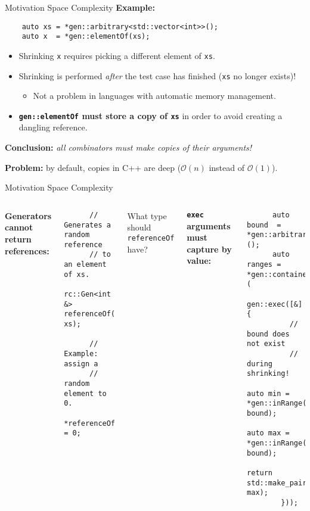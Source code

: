 \begin{frame}[fragile]{\halcheck{} \textemdash{} Motivation \textemdash{} Space Complexity}
  \textbf{Example:}
  \begin{verbatim}
    auto xs = *gen::arbitrary<std::vector<int>>();
    auto x  = *gen::elementOf(xs);
  \end{verbatim}

  \pause{}

  \begin{itemize}
    \item Shrinking \texttt{x} requires picking a different element of \texttt{xs}.
          \pause{}

    \item Shrinking is performed \emph{after} the test case has finished (\texttt{xs} no longer exists)!
          \begin{itemize}
            \item Not a problem in languages with automatic memory management.
          \end{itemize}
          \pause{}

    \item \textbf{\texttt{gen::elementOf} must store a copy of \texttt{xs}} in order to avoid creating a dangling reference.
          \pause{}
  \end{itemize}

  \textbf{Conclusion:} \textit{all combinators must make copies of their arguments!}

  \textbf{Problem:} by default, copies in C++ are deep ($\mathcal{O}(n)$ instead of $\mathcal{O}(1)$).
\end{frame}

\begin{frame}[fragile]{\halcheck{} \textemdash{} Motivation \textemdash{} Space Complexity}
  \begin{columns}[t]
    \textbf{Generators cannot return references:}

    \begin{verbatim}
      // Generates a random reference
      // to an element of xs.
      rc::Gen<int &> referenceOf(??? xs);

      // Example: assign a
      // random element to 0.
      *referenceOf(xs) = 0;
    \end{verbatim}

    What type should \texttt{referenceOf} have?

    \pause{}

    \textbf{\texttt{exec} arguments must capture by value:}
    \begin{verbatim}
      auto bound  = *gen::arbitrary<int>();
      auto ranges = *gen::container<...>(
        gen::exec([&] {
          // bound does not exist
          // during shrinking!
          auto min = *gen::inRange(0, bound);
          auto max = *gen::inRange(min, bound);
          return std::make_pair(min, max);
        }));
    \end{verbatim}
  \end{columns}
\end{frame}

